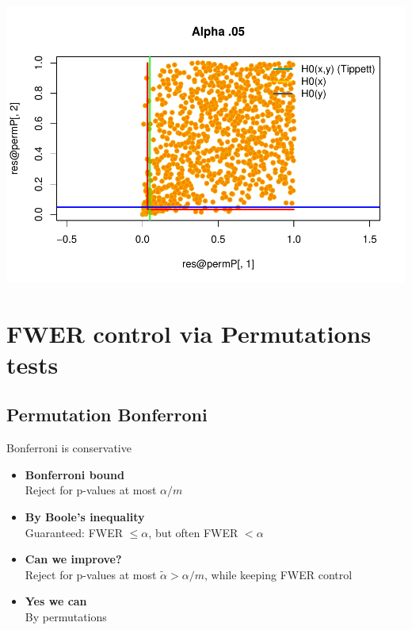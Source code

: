 \documentclass[
]{article}
\providecommand{\tightlist}{%
  \setlength{\itemsep}{0pt}\setlength{\parskip}{0pt}}
\begin{document}
\begin{center}\includegraphics{perm_files/figure-latex/unnamed-chunk-41-1} \end{center}

\hypertarget{fwer-control-via-permutations-tests}{%
\section{FWER control via Permutations
tests}\label{fwer-control-via-permutations-tests}}

\hypertarget{permutation-bonferroni}{%
\subsection{Permutation Bonferroni}\label{permutation-bonferroni}}

Bonferroni is conservative

\begin{itemize}
\tightlist
\item
  \textbf{Bonferroni bound}\\
  Reject for p-values at most \(\alpha/m\)\\
\item
  \textbf{By Boole's inequality}\\
  Guaranteed: FWER \(\leq \alpha\), but often FWER \(<\alpha\)\\
\item
  \textbf{Can we improve?}\\
  Reject for p-values at most \(\tilde\alpha > \alpha/m\), while keeping
  FWER control\\
\item
  \textbf{Yes we can}\\
  By permutations
\end{itemize}
\end{document}
